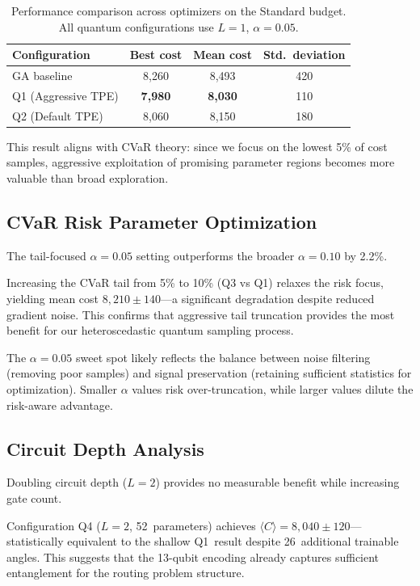 \begin{table}[h]
\centering
\begin{tabular}{lccc}
\toprule
Configuration & Best cost & Mean cost & Std.\ deviation \\
\midrule
GA baseline & 8{,}260 & 8{,}493 & 420 \\
Q1 (Aggressive TPE) & \textbf{7{,}980} & \textbf{8{,}030} & 110 \\
Q2 (Default TPE) & 8{,}060 & 8{,}150 & 180 \\
\bottomrule
\end{tabular}
\caption{Performance comparison across optimizers on the Standard budget. 
         All quantum configurations use $L=1$, $\alpha=0.05$.}
\label{tab:optimisers}
\end{table}

This result aligns with CVaR theory: since we focus on the lowest 5\% of cost 
samples, aggressive exploitation of promising parameter regions becomes more 
valuable than broad exploration.


\subsection{CVaR Risk Parameter Optimization}

The tail-focused $\alpha=0.05$ setting outperforms the broader $\alpha=0.10$ 
by 2.2\%.

Increasing the CVaR tail from 5\% to 10\% (Q3 vs Q1) relaxes the risk focus, 
yielding mean cost $8{,}210\pm140$—a significant degradation despite reduced 
gradient noise. This confirms that aggressive tail truncation provides the 
most benefit for our heteroscedastic quantum sampling process.

The $\alpha=0.05$ sweet spot likely reflects the balance between noise filtering 
(removing poor samples) and signal preservation (retaining sufficient statistics 
for optimization). Smaller $\alpha$ values risk over-truncation, while larger 
values dilute the risk-aware advantage.


\subsection{Circuit Depth Analysis}

Doubling circuit depth ($L=2$) provides no measurable benefit while increasing 
gate count.


Configuration Q4 ($L=2$, 52~parameters) achieves $\langle C\rangle=8{,}040\pm120$—statistically 
equivalent to the shallow Q1~result despite 26~additional trainable angles. 
This suggests that the 13-qubit encoding already captures sufficient entanglement 
for the routing problem structure.


